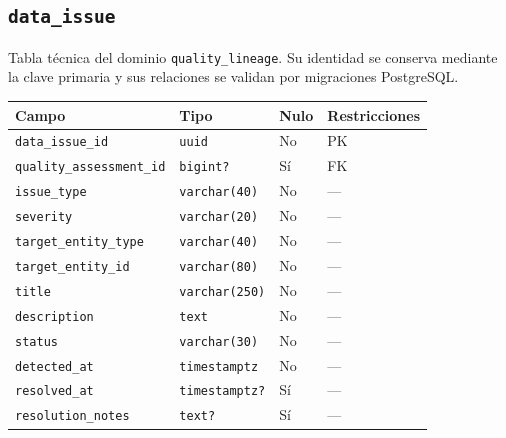 \documentclass[11pt]{article}
\begin{document}
\subsection{\texttt{data\_issue}}
Tabla técnica del dominio \texttt{quality\_lineage}. Su identidad se conserva mediante la clave primaria y sus relaciones se validan por migraciones PostgreSQL.
\begin{longtable}{>{\raggedright\arraybackslash}p{} p{} p{} p{}}
\toprule Campo & Tipo & Nulo & Restricciones \\ \midrule\endhead
\texttt{data\_issue\_id} & \texttt{uuid} & No & PK \\
\texttt{quality\_assessment\_id} & \texttt{bigint?} & Sí & FK \\
\texttt{issue\_type} & \texttt{varchar(40)} & No & --- \\
\texttt{severity} & \texttt{varchar(20)} & No & --- \\
\texttt{target\_entity\_type} & \texttt{varchar(40)} & No & --- \\
\texttt{target\_entity\_id} & \texttt{varchar(80)} & No & --- \\
\texttt{title} & \texttt{varchar(250)} & No & --- \\
\texttt{description} & \texttt{text} & No & --- \\
\texttt{status} & \texttt{varchar(30)} & No & --- \\
\texttt{detected\_at} & \texttt{timestamptz} & No & --- \\
\texttt{resolved\_at} & \texttt{timestamptz?} & Sí & --- \\
\texttt{resolution\_notes} & \texttt{text?} & Sí & --- \\
\bottomrule\end{longtable}
\end{document}
